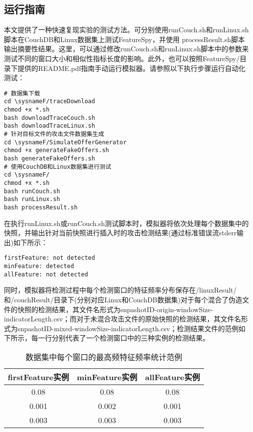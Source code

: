 \subsection*{运行指南}
本文提供了一种快速复现实验的测试方法。可分别使用runCouch.sh和runLinux.sh脚本在CouchDB和Linux数据集上测试FeatureSpy，并使用 processResult.sh脚本输出摘要性结果。这里，可以通过修改runCouch.sh和runLinux.sh脚本中的参数来测试不同的窗口大小和相似性指标长度的影响。此外，也可以按照FeatureSpy/目录下提供的README.pdf指南手动运行模拟器。请参照以下执行步骤运行自动化测试：

\begin{lstlisting}[style=shell]
# 数据集下载
cd \sysnameF/traceDownload
chmod +x *.sh
bash downloadTraceCouch.sh
bash downloadTraceLinux.sh
# 针对目标文件的攻击文件数据集生成
cd \sysnameF/SimulateOfferGenerator
chmod +x generateFakeOffers.sh
bash generateFakeOffers.sh
# 使用CouchDB和Linux数据集进行测试
cd \sysnameF/
chmod +x *.sh
bash runCouch.sh
bash runLinux.sh
bash processResult.sh
\end{lstlisting}

在执行runLinux.sh或runCouch.sh测试脚本时，模拟器将依次处理每个数据集中的快照，并输出针对当前快照进行插入时的攻击检测结果(通过标准错误流stderr输出)如下所示：

\begin{lstlisting}[style=shell]
firstFeature: not detected
minFeature: detected
allFeature: not detected
\end{lstlisting}

同时，模拟器将检测过程中每个检测窗口的特征频率分布保存在\sysnameF/linuxResult/和\sysnameF/couchResult/目录下(分别对应Linux和CouchDB数据集)对于每个混合了伪造文件的快照的检测结果，其文件名形式为{snpashotID}-origin-{windowSize}-{indicatorLength}.csv；而对于未混合攻击文件的原始快照的检测结果，其文件名形式为{snpashotID}-mixed-{windowSize}-{indicatorLength}.csv；检测结果文件的范例如下所示，每一行分别代表了一个检测窗口中\sysnameF 的三种实例的检测结果。

\begin{table}[!htb]
    \small
    \centering
    \begin{tabular}{ccc}
        \toprule
        firstFeature实例 & minFeature实例 & allFeature实例 \\
        \midrule
        0.08             & 0.08           & 0.08           \\
        0.001            & 0.002          & 0.001          \\
        0.003            & 0.003          & 0.003          \\
        \bottomrule
    \end{tabular}
    \caption{数据集中每个窗口的最高频特征频率统计范例}
    \label{tab:system-detection-window}
\end{table}

